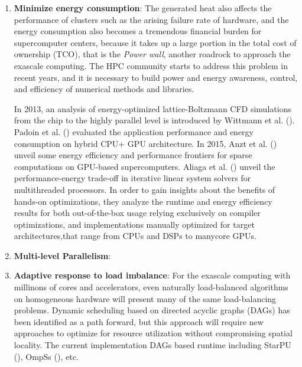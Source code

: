\begin{enumerate}
	\item \textbf{Minimize energy consumption}: The generated heat also affects the performance of clusters such as the arising failure rate of hardware, and the energy consumption also becomes a tremendous financial burden for supercomputer centers, because it takes up a large portion in the total cost of ownership (TCO), that is the \textit{Power wall}, another roadrock to approach the exascale computing. The HPC community starts to address this problem in recent years, and it is necessary to build power and energy awareness, control, and efficiency of numerical methods and libraries. 
	
	In 2013, an analysis of energy-optimized lattice-Boltzmann CFD simulations from the chip to the highly parallel level is introduced by Wittmann et al. (\cite{wittmann2013analysis}). Padoin et al. (\cite{padoin2013evaluating}) evaluated the application performance and energy consumption on hybrid CPU+ GPU architecture. In 2015, Anzt et al. (\cite{anzt2015energy}) unveil some energy efficiency and performance frontiers for sparse computations on GPU-based supercomputers. Aliaga et al. (\cite{aliaga2015unveiling}) unveil the performance-energy trade-off in iterative linear system solvers for multithreaded processors. In order to gain insights about the benefits of hands-on optimizations, they analyze the runtime and energy efficiency results for both out-of-the-box usage relying exclusively on compiler optimizations, and implementations manually optimized for target architectures,that range from CPUs and DSPs to manycore GPUs.
	
	\item \textbf{Multi-level Parallelism}: 
	
	\item \textbf{Adaptive response to load imbalance}: For the exascale computing with millinons of cores and accelerators, even naturally load-balanced algorithms on homogeneous hardware will present many of the same load-balancing problems. Dynamic scheduling based on directed acyclic graphs (DAGs) has been identified as a path forward, but this approach will require new approaches to optimize for resource utilization without compromising spatial locality. The current implementation DAGs based runtime including StarPU (\cite{augonnet2011starpu}), OmpSs (\cite{duran2011ompss}), etc.
	

\end{enumerate}
